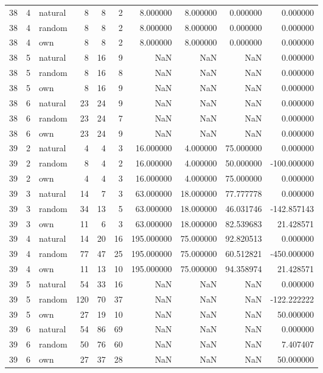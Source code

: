 \begin{table}[htbp]
\begin{tabular}{rrlrrrrrrr}
38 & 4 & natural & 8 & 8 & 2 & 8.000000 & 8.000000 & 0.000000 & 0.000000 \\
38 & 4 & random & 8 & 8 & 2 & 8.000000 & 8.000000 & 0.000000 & 0.000000 \\
38 & 4 & own & 8 & 8 & 2 & 8.000000 & 8.000000 & 0.000000 & 0.000000 \\
38 & 5 & natural & 8 & 16 & 9 & NaN & NaN & NaN & 0.000000 \\
38 & 5 & random & 8 & 16 & 8 & NaN & NaN & NaN & 0.000000 \\
38 & 5 & own & 8 & 16 & 9 & NaN & NaN & NaN & 0.000000 \\
38 & 6 & natural & 23 & 24 & 9 & NaN & NaN & NaN & 0.000000 \\
38 & 6 & random & 23 & 24 & 7 & NaN & NaN & NaN & 0.000000 \\
38 & 6 & own & 23 & 24 & 9 & NaN & NaN & NaN & 0.000000 \\
39 & 2 & natural & 4 & 4 & 3 & 16.000000 & 4.000000 & 75.000000 & 0.000000 \\
39 & 2 & random & 8 & 4 & 2 & 16.000000 & 4.000000 & 50.000000 & -100.000000 \\
39 & 2 & own & 4 & 4 & 3 & 16.000000 & 4.000000 & 75.000000 & 0.000000 \\
39 & 3 & natural & 14 & 7 & 3 & 63.000000 & 18.000000 & 77.777778 & 0.000000 \\
39 & 3 & random & 34 & 13 & 5 & 63.000000 & 18.000000 & 46.031746 & -142.857143 \\
39 & 3 & own & 11 & 6 & 3 & 63.000000 & 18.000000 & 82.539683 & 21.428571 \\
39 & 4 & natural & 14 & 20 & 16 & 195.000000 & 75.000000 & 92.820513 & 0.000000 \\
39 & 4 & random & 77 & 47 & 25 & 195.000000 & 75.000000 & 60.512821 & -450.000000 \\
39 & 4 & own & 11 & 13 & 10 & 195.000000 & 75.000000 & 94.358974 & 21.428571 \\
39 & 5 & natural & 54 & 33 & 16 & NaN & NaN & NaN & 0.000000 \\
39 & 5 & random & 120 & 70 & 37 & NaN & NaN & NaN & -122.222222 \\
39 & 5 & own & 27 & 19 & 10 & NaN & NaN & NaN & 50.000000 \\
39 & 6 & natural & 54 & 86 & 69 & NaN & NaN & NaN & 0.000000 \\
39 & 6 & random & 50 & 76 & 60 & NaN & NaN & NaN & 7.407407 \\
39 & 6 & own & 27 & 37 & 28 & NaN & NaN & NaN & 50.000000 \\

\end{tabular}
\end{table}
